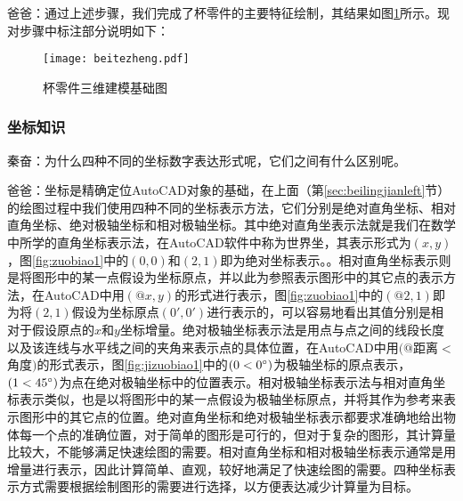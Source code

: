 \begin{procedure}
爸爸：通过上述步骤，我们完成了杯零件的主要特征绘制，其结果如图\ref{fig:bettezheng}所示。现对步骤中标注部分说明如下：
\noindent
\begin{figure}[htbp]
\centering
\texttt{[image: beitezheng.pdf]}
\caption{杯零件三维建模基础图}\label{fig:bettezheng}
\end{figure}
\end{procedure}

\subsubsection{坐标知识}
秦奋：为什么四种不同的坐标数字表达形式呢，它们之间有什么区别呢。

爸爸：坐标是精确定位AutoCAD对象的基础，在上面（第\ref{sec:beilingjianleft}节）的绘图过程中我们使用四种不同的坐标表示方法，它们分别是绝对直角坐标、相对直角坐标、绝对极轴坐标和相对极轴坐标。其中绝对直角坐表示法就是我们在数学中所学的直角坐标表示法，在AutoCAD软件中称为世界坐，其表示形式为$(x,y)$，图\ref{fig:zuobiao1}中的$(0,0)$和$(2,1)$即为绝对坐标表示。。相对直角坐标表示则是将图形中的某一点假设为坐标原点，并以此为参照表示图形中的其它点的表示方法，在AutoCAD中用$(@x,y)$的形式进行表示，图\ref{fig:zuobiao1}中的$(@2,1)$即为将$(2,1)$假设为坐标原点$(0',0')$进行表示的，可以容易地看出其值分别是相对于假设原点的$x$和$y$坐标增量。绝对极轴坐标表示法是用点与点之间的线段长度以及该连线与水平线之间的夹角来表示点的具体位置，在AutoCAD中用$(@$距离$<$角度$)$的形式表示，图\ref{fig:jizuobiao1}中的$(0<0\degree)$为极轴坐标的原点表示，$(1<45\degree)$为点在绝对极轴坐标中的位置表示。相对极轴坐标表示法与相对直角坐标表示类似，也是以将图形中的某一点假设为极轴坐标原点，并将其作为参考来表示图形中的其它点的位置。绝对直角坐标和绝对极轴坐标表示都要求准确地给出物体每一个点的准确位置，对于简单的图形是可行的，但对于复杂的图形，其计算量比较大，不能够满足快速绘图的需要。相对直角坐标和相对极轴坐标表示通常是用增量进行表示，因此计算简单、直观，较好地满足了快速绘图的需要。四种坐标表示方式需要根据绘制图形的需要进行选择，以方便表达减少计算量为目标。
